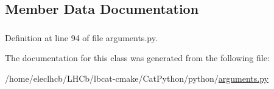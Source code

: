 \subsection{Member Data Documentation}
\hypertarget{classarguments_1_1Usage_af63d211f6341db5a9376f7376eecf473}{
\subsubsection[{msg}]{}}
\label{classarguments_1_1Usage_af63d211f6341db5a9376f7376eecf473}


Definition at line 94 of file arguments.py.

The documentation for this class was generated from the following file:\begin{DoxyCompactItemize}
\item 
/home/eleclhcb/LHCb/lbcat-\/cmake/CatPython/python/\hyperlink{arguments_8py}{arguments.py}\end{DoxyCompactItemize}
